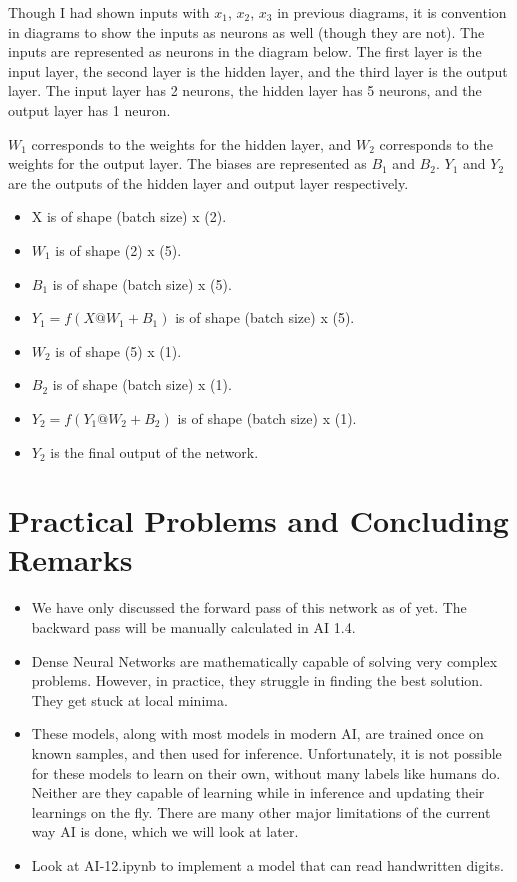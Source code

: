 \documentclass[12pt,a4paper]{article}
\begin{document}
Though I had shown inputs with $x_1$, $x_2$, $x_3$ in previous diagrams, it is convention in diagrams to show the inputs as neurons as well (though they are not). The inputs are represented as neurons in the diagram below. The first layer is the input layer, the second layer is the hidden layer, and the third layer is the output layer. The input layer has 2 neurons, the hidden layer has 5 neurons, and the output layer has 1 neuron.

$W_1$ corresponds to the weights for the hidden layer, and $W_2$ corresponds to the weights for the output layer. The biases are represented as $B_1$ and $B_2$. $Y_1$ and $Y_2$ are the outputs of the hidden layer and output layer respectively. 
\begin{itemize}
    \item X is of shape (batch size) x (2).
    \item $W_1$ is of shape (2) x (5).
    \item $B_1$ is of shape (batch size) x (5).
    \item $Y_1 = f(X @ W_1 + B_1)$ is of shape (batch size) x (5).
    \item $W_2$ is of shape (5) x (1).
    \item $B_2$ is of shape (batch size) x (1).
    \item $Y_2 = f(Y_1 @ W_2 + B_2)$ is of shape (batch size) x (1).
    \item $Y_2$ is the final output of the network.
\end{itemize}

\section{Practical Problems and Concluding Remarks}
\begin{itemize}
    \item We have only discussed the forward pass of this network as of yet. The backward pass will be manually calculated in AI 1.4.
    \item Dense Neural Networks are mathematically capable of solving very complex problems. However, in practice, they struggle in finding the best solution. They get stuck at local minima.
    \item These models, along with most models in modern AI, are trained once on known samples, and then used for inference. Unfortunately, it is not possible for these models to learn on their own, without many labels like humans do. Neither are they capable of learning while in inference and updating their learnings on the fly. There are many other major limitations of the current way AI is done, which we will look at later.
    \item Look at AI-12.ipynb to implement a model that can read handwritten digits. 
\end{itemize}
\end{document}
